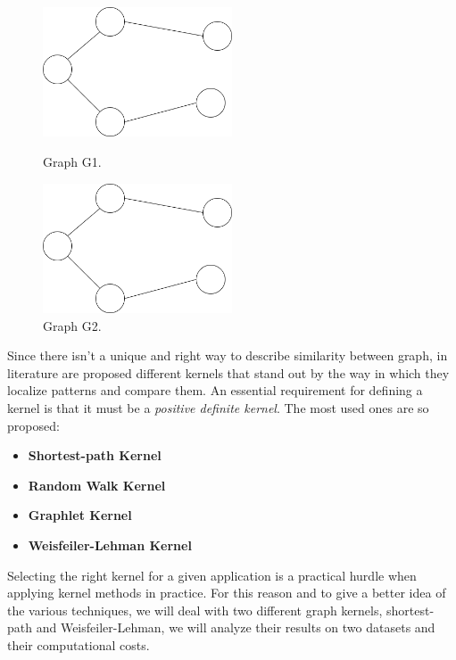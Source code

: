 \documentclass[11pt,a4paper]{article}
\begin{document}
 
 \begin{figure}[H]
 	\begin{minipage}[t]{0.5\linewidth}
 		\centering
 		\includegraphics[width=0.5\textwidth]{img/graph_1.png}
 		\caption{Graph G1.}
 		\label{f1}
 	\end{minipage}
 	\hspace{0.1cm}
 	\begin{minipage}[t]{0.5\linewidth} 
 		\centering
 		\includegraphics[width=0.5\textwidth]{img/graph_1.png}
 		\caption{Graph G2.}
 		\label{f2}
 	\end{minipage}        
 \end{figure} 



Since there isn't a unique and right way to describe similarity between graph, in literature are proposed different kernels that stand out by the way in which they localize patterns and compare them. An essential requirement for defining a kernel is that it must be a \textit{positive definite kernel}. The most used ones are so proposed:
\begin{itemize}
	\item \textbf{Shortest-path Kernel}
	\item \textbf{Random Walk Kernel}
	\item \textbf{Graphlet Kernel}
	\item \textbf{Weisfeiler-Lehman Kernel}
\end{itemize}
Selecting the right kernel for a given application is a practical hurdle when applying kernel methods in practice. For this reason and to give a better idea of the various techniques, we will deal with two different graph kernels, shortest-path and Weisfeiler-Lehman, we will analyze their results on two datasets and their computational costs.
\end{document}
